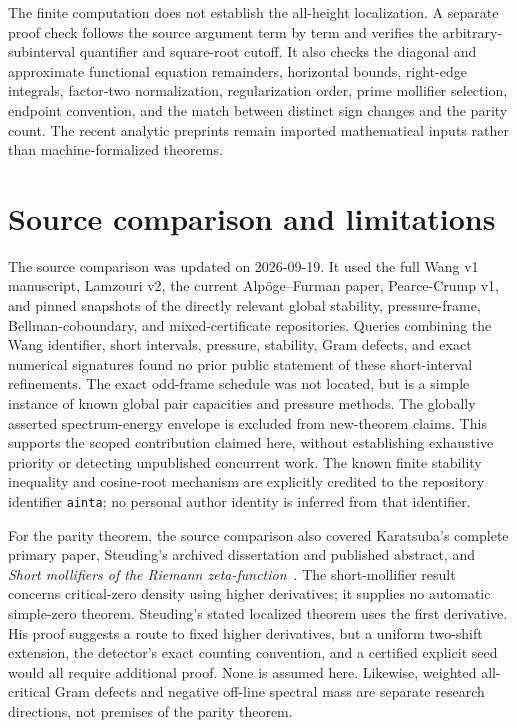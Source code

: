 \documentclass[11pt]{article}
\theoremstyle{remark}
\begin{document}
The finite computation does not establish the all-height localization. A
separate proof check follows the source argument term by term and verifies
the arbitrary-subinterval quantifier and square-root cutoff. It also checks
the diagonal and approximate functional equation remainders, horizontal bounds,
right-edge integrals, factor-two normalization, regularization order,
prime mollifier selection, endpoint convention, and the match between
distinct sign changes and the parity count. The recent analytic preprints
remain imported mathematical inputs rather than machine-formalized theorems.

\section{Source comparison and limitations}

The source comparison was updated on 2026-09-19. It used the full
Wang v1 manuscript, Lamzouri v2, the current Alp\"oge--Furman paper,
Pearce-Crump v1,
and pinned snapshots of the directly relevant global stability,
pressure-frame, Bellman-coboundary, and mixed-certificate repositories.
Queries combining the Wang identifier, short intervals, pressure,
stability, Gram defects, and exact numerical signatures found no prior
public statement of these short-interval refinements. The exact odd-frame
schedule was not located, but is a simple instance of known global pair
capacities and pressure methods. The globally asserted spectrum-energy
envelope is excluded from new-theorem claims. This supports the
scoped contribution claimed here, without establishing exhaustive
priority or detecting unpublished concurrent work. The known finite
stability inequality and cosine-root mechanism are explicitly credited
to the repository identifier \texttt{ainta}; no personal author identity
is inferred from that identifier.

For the parity theorem, the source comparison also covered Karatsuba's
complete primary paper, Steuding's archived dissertation and published
abstract, and
\emph{Short mollifiers of the Riemann zeta-function}~\cite{CFKL}.
The short-mollifier result concerns critical-zero density
using higher derivatives; it supplies no automatic simple-zero theorem.
Steuding's stated localized theorem uses the first derivative. His proof
suggests a route to fixed higher derivatives, but a uniform two-shift
extension, the detector's exact counting convention, and a certified
explicit seed would all require additional proof. None is assumed here.
Likewise, weighted all-critical Gram defects and negative off-line spectral
mass are separate research directions, not premises of the parity theorem.
\end{document}
